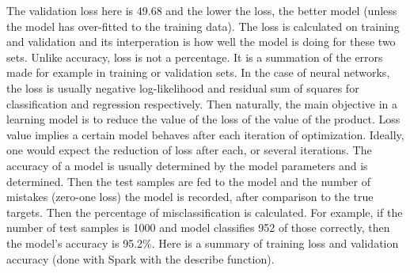 \documentclass{acmtog} %
\begin{document}
The validation loss here is 49.68 and the lower the loss, the better model (unless the model has over-fitted to the training data). The loss is calculated on training and validation and its interperation is how well the model is doing for these two sets. Unlike accuracy, loss is not a percentage. It is a summation of the errors made for example in training or validation sets.
In the case of neural networks, the loss is usually negative log-likelihood and residual sum of squares for classification and regression respectively. Then naturally, the main objective in a learning model is to reduce the value of the loss of the value of the product.
Loss value implies a certain model behaves after each iteration of optimization. Ideally, one would expect the reduction of loss after each, or several iterations.
The accuracy of a model is usually determined by the model parameters and is determined. Then the test samples are fed to the model and the number of mistakes (zero-one loss) the model is recorded, after comparison to the true targets. Then the percentage of misclassification is calculated.
For example, if the number of test samples is 1000 and model classifies 952 of those correctly, then the model's accuracy is 95.2\%.
Here is a summary of training loss and validation accuracy (done with Spark with the describe function).


\begin{table}[H]
\label{tab:training_loss_a}
\end{table}


\begin{table}[H]
\label{tab:valid_loss_b}
\end{table}
\end{document}
